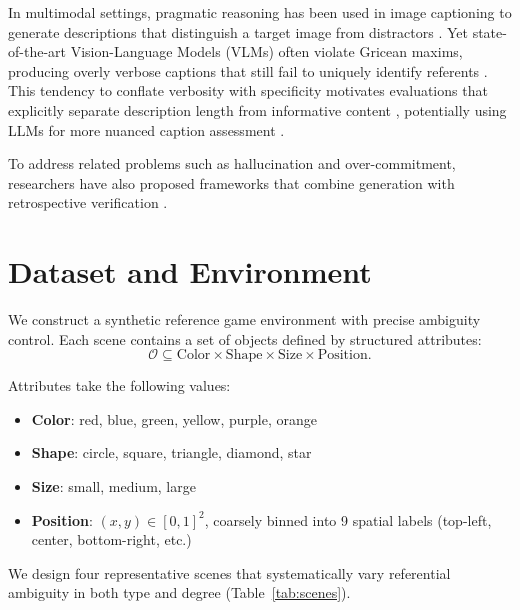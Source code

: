 \documentclass[10pt]{article}
\begin{document}
In multimodal settings, pragmatic reasoning has been used in image captioning to generate descriptions that distinguish a target image from distractors \cite{ou2023clip}. Yet state-of-the-art Vision-Language Models (VLMs) often violate Gricean maxims, producing overly verbose captions that still fail to uniquely identify referents \cite{ma2025vision}. This tendency to conflate verbosity with specificity motivates evaluations that explicitly separate description length from informative content \cite{kapur2026when}, potentially using LLMs for more nuanced caption assessment \cite{chan2023clair}. 

To address related problems such as hallucination and over-commitment, researchers have also proposed frameworks that combine generation with retrospective verification \cite{wu2025generate}.

\section{Dataset and Environment}

We construct a synthetic reference game environment with precise ambiguity control. Each scene contains a set of objects defined by structured attributes:
\vspace{-3mm}
\[
\mathcal{O} \subseteq \text{Color} \times \text{Shape} \times \text{Size} \times \text{Position}.
\]
\vspace{-7mm}

Attributes take the following values:
\begin{itemize}[noitemsep, topsep=0pt]
\item \textbf{Color}: red, blue, green, yellow, purple, orange
\item \textbf{Shape}: circle, square, triangle, diamond, star
\item \textbf{Size}: small, medium, large
\item \textbf{Position}: $(x,y) \in [0,1]^2$, coarsely binned into 9 spatial labels (top-left, center, bottom-right, etc.)
\end{itemize}

We design four representative scenes that systematically vary referential ambiguity in both type and degree (Table~\ref{tab:scenes}).

\vspace{-2mm}
\end{document}
